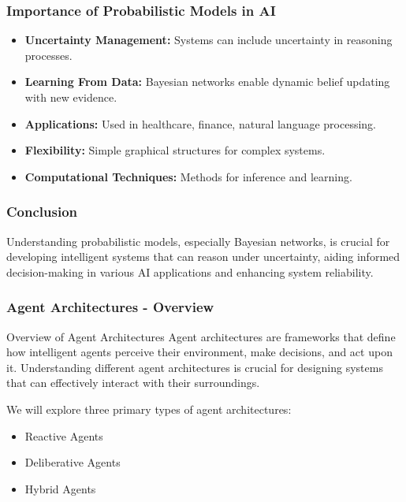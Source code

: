 \documentclass[aspectratio=169]{beamer}
\begin{document}
\begin{frame}[fragile]
    \frametitle{Importance of Probabilistic Models in AI}
    \begin{itemize}
        \item \textbf{Uncertainty Management:} Systems can include uncertainty in reasoning processes.
        \item \textbf{Learning From Data:} Bayesian networks enable dynamic belief updating with new evidence.
        \item \textbf{Applications:} Used in healthcare, finance, natural language processing.
        \item \textbf{Flexibility:} Simple graphical structures for complex systems.
        \item \textbf{Computational Techniques:} Methods for inference and learning.
    \end{itemize}
\end{frame}

\begin{frame}[fragile]
    \frametitle{Conclusion}
    Understanding probabilistic models, especially Bayesian networks, is crucial for developing intelligent systems that can reason under uncertainty, aiding informed decision-making in various AI applications and enhancing system reliability.
\end{frame}

\begin{frame}[fragile]
  \frametitle{Agent Architectures - Overview}
  \begin{block}{Overview of Agent Architectures}
    Agent architectures are frameworks that define how intelligent agents perceive their environment, make decisions, and act upon it. Understanding different agent architectures is crucial for designing systems that can effectively interact with their surroundings.
  \end{block}
  We will explore three primary types of agent architectures:
  \begin{itemize}
    \item Reactive Agents
    \item Deliberative Agents
    \item Hybrid Agents
  \end{itemize}
\end{frame}
\end{document}
